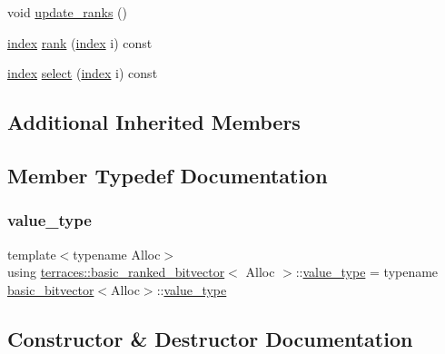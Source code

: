 \begin{DoxyCompactItemize}
void \hyperlink{classterraces_1_1basic__ranked__bitvector_a329e1115f06aa09cf71ec659ba4a0c13}{update\+\_\+ranks} ()
\item 
\hyperlink{namespaceterraces_adbc33ccb543d1634e96d0eb02e472c77}{index} \hyperlink{classterraces_1_1basic__ranked__bitvector_a9e06ab9864653c65a1d4c8c8d72eaac1}{rank} (\hyperlink{namespaceterraces_adbc33ccb543d1634e96d0eb02e472c77}{index} i) const
\item 
\hyperlink{namespaceterraces_adbc33ccb543d1634e96d0eb02e472c77}{index} \hyperlink{classterraces_1_1basic__ranked__bitvector_a56bd3b3ec826c18f78c6bd4012b8da8f}{select} (\hyperlink{namespaceterraces_adbc33ccb543d1634e96d0eb02e472c77}{index} i) const
\end{DoxyCompactItemize}
\subsection*{Additional Inherited Members}


\subsection{Member Typedef Documentation}
\mbox{\label{classterraces_1_1basic__ranked__bitvector_affd5ab8cf4bfba9184dbdd57f4d07bcb}} 
\subsubsection{\texorpdfstring{value\+\_\+type}{value\_type}}
{\footnotesize\ttfamily template$<$typename Alloc$>$ \\
using \hyperlink{classterraces_1_1basic__ranked__bitvector}{terraces\+::basic\+\_\+ranked\+\_\+bitvector}$<$ Alloc $>$\+::\hyperlink{classterraces_1_1basic__ranked__bitvector_affd5ab8cf4bfba9184dbdd57f4d07bcb}{value\+\_\+type} =  typename \hyperlink{classterraces_1_1basic__bitvector}{basic\+\_\+bitvector}$<$Alloc$>$\+::\hyperlink{classterraces_1_1basic__ranked__bitvector_affd5ab8cf4bfba9184dbdd57f4d07bcb}{value\+\_\+type}}



\subsection{Constructor \& Destructor Documentation}
\mbox{\label{classterraces_1_1basic__ranked__bitvector_a5c6565730dd4f847b9538ea2cb29bdce}} 

